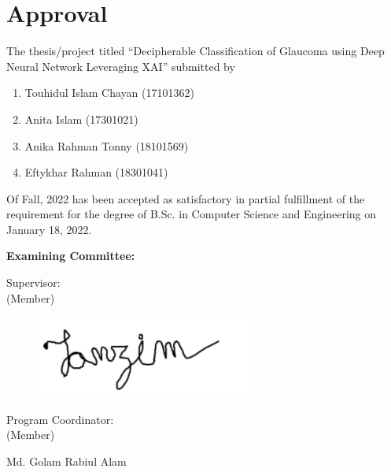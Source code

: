\section*{Approval}

The thesis/project titled “Decipherable Classification of Glaucoma using Deep Neural Network Leveraging XAI” submitted by 
\begin{enumerate}
  \item Touhidul Islam Chayan (17101362)
  \item Anita Islam (17301021)
  \item Anika Rahman Tonny (18101569) 
  \item Eftykhar Rahman (18301041)
\end{enumerate}

Of Fall, 2022 has been accepted as satisfactory in partial fulfillment of the requirement for the degree of B.Sc. in Computer Science and Engineering on January 18, 2022. 

\textbf{Examining Committee:}

Supervisor:\\
(Member)
\begin{center}
\begin{figure}[hbt!]
\raggedleft
\includegraphics[scale=0.3]{images/tanjimRezaSir.png}\ \ \ \ \ \ \ \ \ \ \ \ \ \ \ \ \ \
\end{figure}    
    \hspace{7cm}  \hspace{1cm} 
\end{center}

Program Coordinator:\\
(Member)
\begin{center}
    \hspace{7cm} Md. Golam Rabiul Alam \\
    \hspace{7cm}  \hspace{1cm} 
\end{center}

